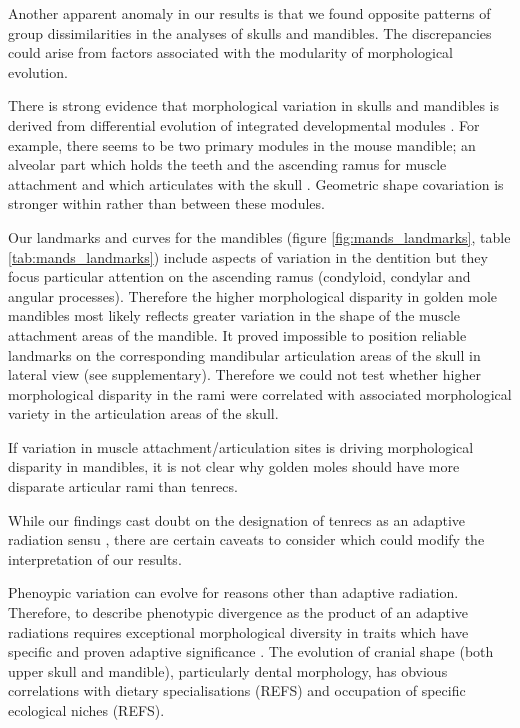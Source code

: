 \documentclass[12pt,a4paper]{article}
\begin{document}
Another apparent anomaly in our results is that we found opposite patterns of group dissimilarities in the analyses of skulls and mandibles. The discrepancies could arise from factors associated with the modularity of morphological evolution.

There is strong evidence that morphological variation in skulls and mandibles is derived from differential evolution of integrated developmental modules \citep[reviewed by][]{Klingenberg2013a}.
For example, there seems to be two primary modules in the mouse mandible; an alveolar part which holds the teeth and the ascending ramus for muscle attachment and which articulates with the skull \citep{Klingenberg2008a}. Geometric shape covariation is stronger within rather than between these modules. 

Our landmarks and curves for the mandibles (figure \ref{fig:mands_landmarks}, table \ref{tab:mands_landmarks}) include aspects of variation in the dentition but they focus particular attention on the ascending ramus (condyloid, condylar and angular processes). Therefore the higher morphological disparity in golden mole mandibles most likely reflects greater variation in the shape of the muscle attachment areas of the mandible. It proved impossible to position reliable landmarks on the corresponding mandibular articulation areas of the skull in lateral view (see supplementary). Therefore we could not test whether higher morphological disparity in the rami were correlated with associated morphological variety in the articulation areas of the skull.

If variation in muscle attachment/articulation sites is driving morphological disparity in mandibles, it is not clear why golden moles should have more disparate articular rami than tenrecs. 

 


While our findings cast doubt on the designation of tenrecs as an adaptive radiation sensu \citep{Losos2010a}, there are certain caveats to consider which could modify the interpretation of our results.

Phenoypic variation can evolve for reasons other than adaptive radiation. Therefore, to describe phenotypic divergence as the product of an adaptive radiations requires exceptional morphological diversity in traits which have specific and proven adaptive significance \citep{Losos2010a}. The evolution of cranial shape (both upper skull and mandible), particularly dental morphology, has obvious correlations with dietary specialisations (REFS) and occupation of specific ecological niches (REFS). %
\end{document}
